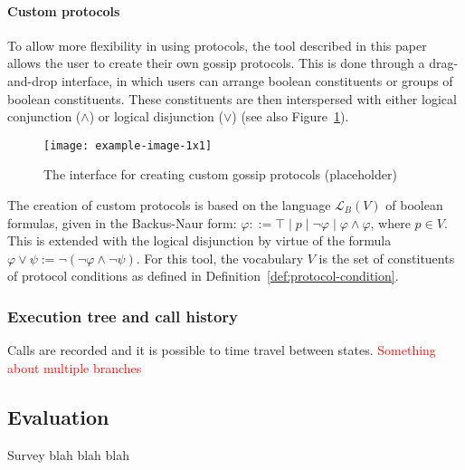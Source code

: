 \paragraph{Custom protocols}
\label{sec:custom-protocols}
To allow more flexibility in using protocols, 
the tool described in this paper allows the user to create their own gossip protocols.
This is done through a drag-and-drop interface,
in which users can arrange boolean constituents or groups of boolean constituents.
These constituents are then interspersed with either logical conjunction (\(\land\)) or logical disjunction (\(\lor\)) (see also Figure~\ref{fig:protocol-creator}).

\begin{figure}[htb!]
    \centering
    \texttt{[image: example-image-1x1]}
    \caption{The interface for creating custom gossip protocols (placeholder)}
    \label{fig:protocol-creator}
\end{figure}

The creation of custom protocols is based on the language \(\mathcal{L}_B(V)\) of boolean formulas, 
given in the Backus-Naur form:
\(\varphi ::= \top \mid p \mid \neg \varphi \mid \varphi \land \varphi\), where \(p \in V\). This is extended with the logical disjunction by virtue of the formula \(\varphi \lor \psi := \neg(\neg\varphi \land \neg\psi)\).
For this tool, the vocabulary \(V\) is the set of constituents of protocol conditions as defined in Definition~\ref{def:protocol-condition}.

\subsubsection{Execution tree and call history}

Calls are recorded and it is possible to time travel between states.
\textcolor{red}{Something about multiple branches}

\subsection{Evaluation}

Survey blah blah blah